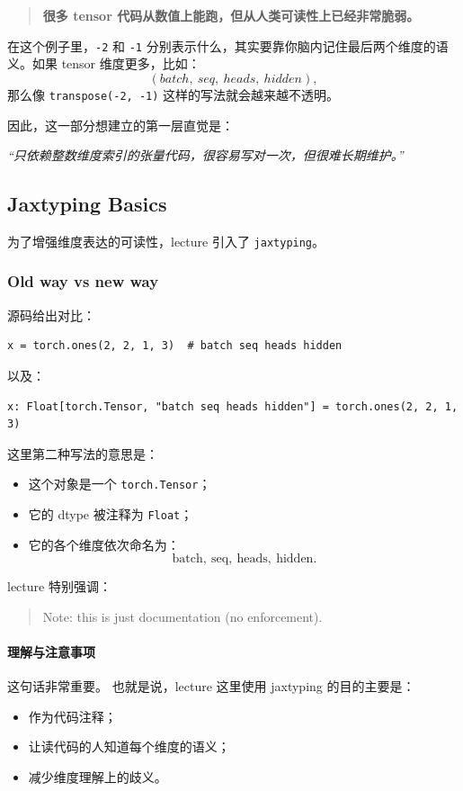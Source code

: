 \documentclass[a4paper,UTF8]{article}
\numberwithin{equation}{section}
\begin{document}
\begin{quote}
\textbf{很多 tensor 代码从数值上能跑，但从人类可读性上已经非常脆弱。}
\end{quote}

在这个例子里，\verb|-2| 和 \verb|-1| 分别表示什么，其实要靠你脑内记住最后两个维度的语义。如果 tensor 维度更多，比如：
\[
(batch,\ seq,\ heads,\ hidden),
\]
那么像 \verb|transpose(-2, -1)| 这样的写法就会越来越不透明。

因此，这一部分想建立的第一层直觉是：
\begin{center}
\emph{“只依赖整数维度索引的张量代码，很容易写对一次，但很难长期维护。”}
\end{center}

\subsection{Jaxtyping Basics}

为了增强维度表达的可读性，lecture 引入了 \verb|jaxtyping|。

\subsubsection{Old way vs new way}

源码给出对比：
\begin{verbatim}
x = torch.ones(2, 2, 1, 3)  # batch seq heads hidden
\end{verbatim}

以及：
\begin{verbatim}
x: Float[torch.Tensor, "batch seq heads hidden"] = torch.ones(2, 2, 1, 3)
\end{verbatim}

这里第二种写法的意思是：
\begin{itemize}
    \item 这个对象是一个 \verb|torch.Tensor|；
    \item 它的 dtype 被注释为 \verb|Float|；
    \item 它的各个维度依次命名为：
    \[
    \text{batch},\ \text{seq},\ \text{heads},\ \text{hidden}.
    \]
\end{itemize}

lecture 特别强调：
\begin{quote}
Note: this is just documentation (no enforcement).
\end{quote}

\paragraph{理解与注意事项}
这句话非常重要。  
也就是说，lecture 这里使用 jaxtyping 的目的主要是：
\begin{itemize}
    \item 作为代码注释；
    \item 让读代码的人知道每个维度的语义；
    \item 减少维度理解上的歧义。
\end{itemize}
\end{document}
